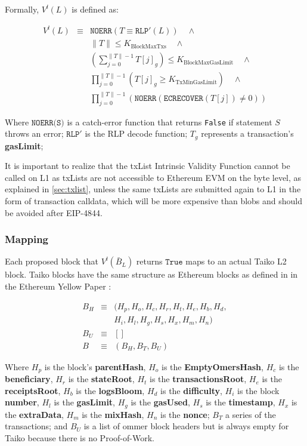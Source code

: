 \documentclass[9pt,oneside]{amsart}
\begin{document}
\begin{multicols}{2}
Formally, $V^l(L)$ is defined as:


\begin{eqnarray}
V^l(L) & \equiv & \texttt{NOERR}(T \equiv \texttt{RLP}'(L))  \quad \wedge  \\
\nonumber& & \lVert T \rVert \le K_{\mathrm{BlockMaxTxs}} \quad \wedge \\
\nonumber & & (\sum_{j = 0}^{\lVert T \rVert - 1}T[j]_g) \le K_{\mathrm{BlockMaxGasLimit}} \quad \wedge \\
\nonumber & & \prod_{j = 0}^{\lVert T \rVert - 1} (T[j]_g \ge K_{\mathrm{TxMinGasLimit}})\quad \wedge \\
\nonumber & & \prod_{j = 0}^{\lVert T \rVert - 1} (\texttt{NOERR}(\texttt{ECRECOVER}(T[j]) \ne 0) )
\end{eqnarray}

Where $\texttt{NOERR(S)}$ is a catch-error function that returns \texttt{False} if statement $S$ throws an error; $\texttt{RLP}'$ is the RLP decode function;  $T_g$ represents a transaction's \textbf{gasLimit}; 





It is important to realize that the txList Intrinsic Validity Function cannot be called on L1 as txLists are not accessible to Ethereum EVM on the byte level, as explained in \ref{sec:txlist}, unless the same txLists are submitted again to L1 in the form of transaction calldata, which will be more expensive than blobs and should be avoided after EIP-4844\cite{eip4844}.

\subsubsection{Mapping}

Each proposed block that $V^l(\bar{B}_L)$ returns $\texttt{True}$ maps to an actual Taiko L2 block. Taiko blocks have the same structure as Ethereum blocks as defined in in the Ethereum Yellow Paper \cite{ethyellowpaper}:

\begin{eqnarray}
B_H & \equiv & (H_p, H_o, H_c, H_r, H_t, H_e, H_b, H_d, \\
\nonumber & & H_i, H_l,H_g, H_s, H_x, H_m, H_n) \\
B_U  & \equiv & [] \\
B & \equiv & (B_H, B_T, B_U)
\end{eqnarray}

Where $H_p$ is the block's \textbf{parentHash}, $H_o$ is the \textbf{EmptyOmersHash}, $H_c$ is the \textbf{beneficiary}, $H_r$ is the \textbf{stateRoot}, $H_t$ is the \textbf{transactionsRoot}, $H_e$ is the \textbf{receiptsRoot}, $H_b$ is the \textbf{logsBloom}, $H_d$ is the \textbf{difficulty}, $H_i$ is the block \textbf{number}, $H_l$ is the \textbf{gasLimit}, $H_g$ is the \textbf{gasUsed}, $H_s$ is the \textbf{timestamp}, $H_x$ is the \textbf{extraData}, $H_m$ is the \textbf{mixHash}, $H_n$ is the \textbf{nonce}; $B_T$ a series of the transactions; and $B_U$ is a list of ommer block headers but is always empty for Taiko because there is no Proof-of-Work.


\end{multicols}
\end{document}
